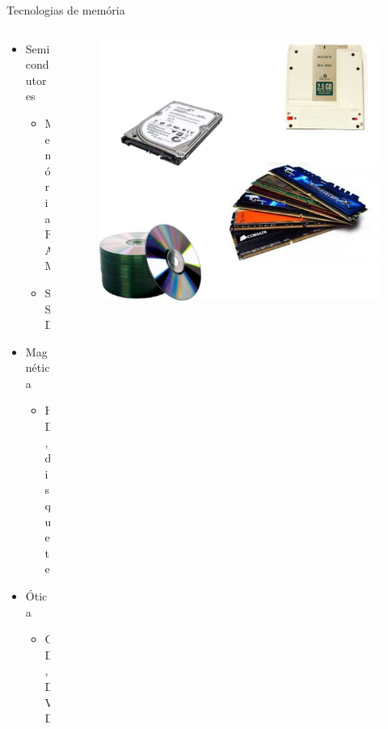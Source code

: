\documentclass[aspectratio=169,
				xcolor=table]{beamer}
\begin{document}
	\begin{frame}{Tecnologias de memória}
		\begin{columns}
			\begin{column}{0.5\textwidth}
				\begin{itemize}
					\item Semicondutores 
					\begin{itemize}
						\item Memória RAM
						\item SSD
					\end{itemize}
					\vspace{1em}
					\item Magnética
					\begin{itemize}
						\item HD, disquete
					\end{itemize}
					\vspace{1em}
					\item Ótica
					\begin{itemize}
						\item CD, DVD
					\end{itemize}
				\end{itemize}
			\end{column}
			\begin{column}{0.5\textwidth}
				\begin{figure}[hbtp]
				\centering
				\includegraphics[height=.7\textheight, keepaspectratio]{../figs/cap07/tecnologias.png}
				\end{figure}
				
			\end{column}
		\end{columns}
	\end{frame}
	
\end{document}
